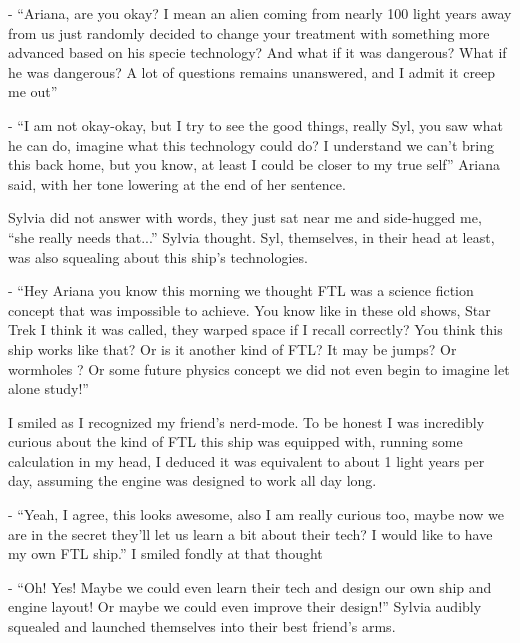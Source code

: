 \documentclass[colorlinks,12pt,a4paper]{book}
\begin{document}
- “Ariana, are you okay? I mean an alien coming from nearly 100 light years away from us just randomly decided to 
change your treatment with something more advanced based on his specie technology? And what if it was dangerous? 
What if he was dangerous? A lot of questions remains unanswered, and I admit it creep me out”\par
\bigskip

- “I am not okay-okay, but I try to see the good things, really Syl, you saw what he can do, imagine what this technology 
could do? I understand we can't bring this back home, but you know, at least I could be closer to my true self” 
Ariana said, with her tone lowering at the end of her sentence.\par
\bigskip

Sylvia did not answer with words, they just sat near me and side-hugged me, “she really needs that...” 
Sylvia thought. Syl, themselves, in their head at least, was also squealing about this ship's technologies.\par
\bigskip

- “Hey Ariana you know this morning we thought FTL was a science fiction concept that was impossible to achieve. 
You know like in these old shows, Star Trek I think it was called, they warped space if I recall correctly? You think 
this ship works like that? Or is it another kind of FTL? It may be jumps? Or wormholes ? Or some future physics concept
 we did not even begin to imagine let alone study!”\par
 \bigskip

I smiled as I recognized my friend's nerd-mode. To be honest I was incredibly curious about the kind of FTL this ship was 
equipped with, running some calculation in my head, I deduced it was equivalent to about 1 light years per day, assuming 
the engine was designed to work all day long.\par
\bigskip

- “Yeah, I agree, this looks awesome, also I am really curious too, maybe now we are in the secret they'll let us learn a bit 
about their tech? I would like to have my own FTL ship.” I smiled fondly at that thought\par
\bigskip

- “Oh! Yes! Maybe we could even learn their tech and design our own ship and engine layout! Or maybe we could even improve 
their design!” Sylvia audibly squealed and launched themselves into their best friend's arms.\par
\bigskip
\end{document}
